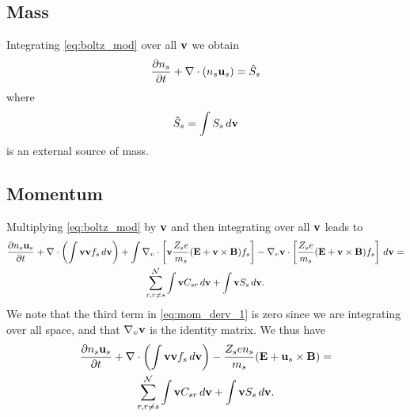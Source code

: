 \documentclass[a4paper,11pt]{report}
\begin{document}
\subsection{Mass}
Integrating \cref{eq:boltz_mod} over all $\mathbf{v}$ we obtain
\begin{equation}
\frac{\partial n_s}{\partial t} + \nabla \cdot \left ( n_s \mathbf{u}_s \right ) = \hat{S}_s
\end{equation}
where 
\begin{equation}
\hat{S}_s = \int S_s \, d\mathbf{v}
\end{equation}
is an external source of mass.

\subsection{Momentum}
Multiplying \cref{eq:boltz_mod} by $\mathbf{v}$ and then integrating over all $\mathbf{v}$ leads to
\begin{multline}
\label{eq:mom_derv_1}
\frac{\partial n_s \mathbf{u}_s}{\partial t} + \nabla \cdot \left ( \int \mathbf{v} \mathbf{v} f_s \, d\mathbf{v} \right) + \int \nabla_v \cdot \left [ \mathbf{v} \frac{Z_s e}{m_s} ( \mathbf{E} + \mathbf{v} \times \mathbf{B} ) f_s \right ] - \nabla_v \mathbf{v} \cdot \left [ \frac{Z_s e}{m_s} ( \mathbf{E} + \mathbf{v} \times \mathbf{B} ) f_s \right ] \, d\mathbf{v} =\\
\sum_{r, r \ne s}^\mathcal{N} \int \mathbf{v} C_{s r} \, d\mathbf{v} + \int \mathbf{v} S_s \, d\mathbf{v}.
\end{multline}
We note that the third term in \cref{eq:mom_derv_1} is zero since we are integrating over all space, and that $\nabla_v \mathbf{v}$ is the identity matrix. We thus have
\begin{multline}
\label{eq:mom_derv_2}
\frac{\partial n_s \mathbf{u}_s}{\partial t} + \nabla \cdot \left ( \int \mathbf{v} \mathbf{v} f_s \, d\mathbf{v} \right) - \frac{Z_s e n_s}{m_s} ( \mathbf{E} + \mathbf{u}_s \times \mathbf{B} ) =\\
\sum_{r, r \ne s}^\mathcal{N} \int \mathbf{v} C_{s r} \, d\mathbf{v} + \int \mathbf{v} S_s \, d\mathbf{v}.
\end{multline}
\end{document}
